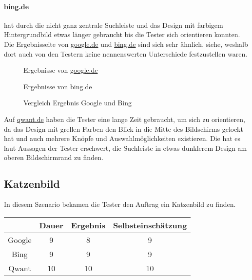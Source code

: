 \paragraph{\url{bing.de}} hat durch die nicht ganz zentrale Suchleiste und das Design mit farbigem Hintergrundbild etwas länger gebraucht bis die Tester sich orientieren konnten.
Die Ergebnisseite von \url{google.de} und \url{bing.de} sind sich sehr ähnlich, siehe, weshalb dort auch von den Testern keine nennenswerten Unterschiede festzustellen waren.\\
\begin{figure}
    \centering
    \begin{minipage}[t]{0.45\linewidth}
        \centering
        Ergebnisse von \url{google.de}
    \end{minipage}%
    \hfill\vrule\hfill
    \begin{minipage}[t]{0.45\linewidth}
        \centering
        Ergebnisse von \url{bing.de}
    \end{minipage}
    \caption{Vergleich Ergebnis Google und Bing}\label{fig:tag_des_internets_results}
\end{figure}

\noindent Auf \url{qwant.de} haben die Tester eine lange Zeit gebraucht, um sich zu orientieren,
da das Design mit grellen Farben den Blick in die Mitte des Bildschirms gelockt hat und auch mehrere Knöpfe und Auswahlmöglichkeiten existieren.
Die hat es laut Aussagen der Tester erschwert, die Suchleiste in etwas dunklerem Design am oberen Bildschirmrand zu finden.

\subsection{Katzenbild}\label{subsec:szenario2}
In diesem Szenario bekamen die Tester den Auftrag ein Katzenbild zu finden.

\begin{tabular}{|c|c|c|c|}
    \hline
    & Dauer & Ergebnis & Selbsteinschätzung \\
    \hline
    Google & 9     & 8        & 9                  \\
    \hline
    Bing   & 9     & 9        & 9                  \\
    \hline
    Qwant  & 10    & 10       & 10                 \\
    \hline
\end{tabular}

